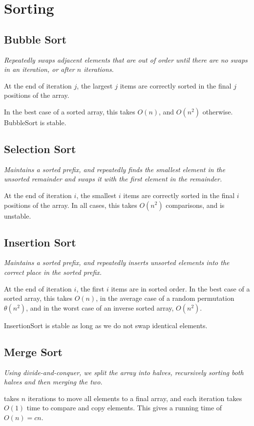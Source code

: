\section{Sorting}

\subsection{Bubble Sort}
\emph{Repeatedly swaps adjacent elements that are out of order until there are no swaps in an iteration, or after $n$ iterations.}

At the end of iteration $j$, the largest $j$ items are correctly sorted in the final $j$ positions of the array.

In the best case of a sorted array, this takes $O(n)$, and $O(n^2)$ otherwise. BubbleSort is stable.

\subsection{Selection Sort}
\emph{Maintains a sorted prefix, and repeatedly finds the smallest element in the unsorted remainder and swaps it with the first element in the remainder.}

At the end of iteration $i$, the smallest $i$ items are correctly sorted in the final $i$ positions of the array.
In all cases, this takes $O(n^2)$ comparisons, and is unstable.

\subsection{Insertion Sort}
\emph{Maintains a sorted prefix, and repeatedly inserts unsorted elements into the correct place in the sorted prefix.}

At the end of iteration $i$, the first $i$ items are in sorted order.
In the best case of a sorted array, this takes $O(n)$, in the average case of a random permutation $\theta(n^2)$,
and in the worst case of an inverse sorted array, $O(n^2)$.

InsertionSort is stable as long as we do not swap identical elements.

\subsection{Merge Sort}
\emph{Using divide-and-conquer, we split the array into halves, recursively sorting both halves and then merging the two.}

 takes $n$ iterations to move all elements to a final array, and each iteration takes $O(1)$ time to compare and copy elements.
This gives a running time of $O(n) = cn$.

